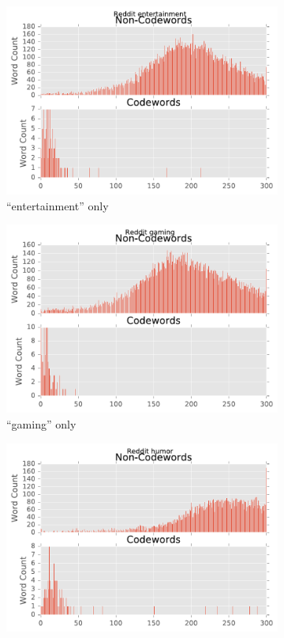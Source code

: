 \begin{figure}[H]
\begin{subfigure}[t]{.4\textwidth}
\centering\includegraphics[]{figures/reddit-entertainment-only-count.pdf}
\caption{``entertainment'' only}
\label{fig-reddit-entertainment-only-count}
\end{subfigure}
\begin{subfigure}[t]{.4\textwidth}
\centering\includegraphics[]{figures/reddit-gaming-only-count.pdf}
\caption{``gaming'' only}
\label{fig-reddit-gaming-only-count}
\end{subfigure}
\begin{subfigure}[t]{.4\textwidth}
\centering\includegraphics[]{figures/reddit-humor-only-count.pdf}

\end{subfigure}
\end{figure}
